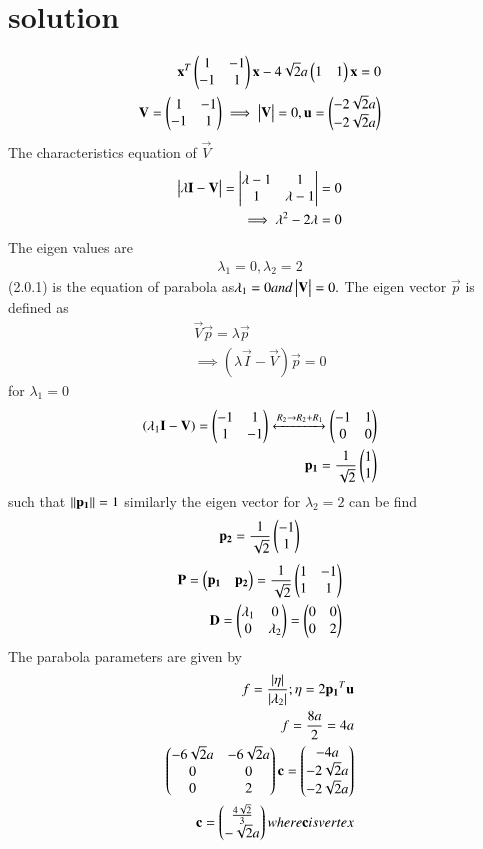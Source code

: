 \documentclass[journal,12pt,twocolumn]{IEEEtran}
\begin{document}
\section{solution}
\begin{align}
\mathbf{x}^T\begin{pmatrix}1&-1\\-1&1\end{pmatrix}\mathbf{x}-4\sqrt{2}a\begin{pmatrix}1&1\end{pmatrix}\mathbf{x}=0\\
\mathbf{V}=\begin{pmatrix}1&-1\\-1&1\end{pmatrix}\implies\begin{vmatrix}\mathbf{V}\end{vmatrix}=0,\mathbf{u}=\begin{pmatrix}-2\sqrt{2}a\\-2\sqrt{2}a\end{pmatrix}
\end{align}
The characteristics equation of $\vec{V}$
\begin{align}
\begin{vmatrix}\lambda\mathbf{I}-\mathbf{V}\end{vmatrix}=\begin{vmatrix}\lambda-1&1\\1&\lambda-1\end{vmatrix}=0\\
\implies\lambda^{2}-2\lambda=0
\end{align}
The eigen values are
\begin{align}
  \lambda{_1}=0,\lambda{_2} =2
\end{align}
(2.0.1) is the equation of parabola as$\lambda{_1}=0 and \begin{vmatrix}\mathbf{V}\end{vmatrix}=0.$ 
The eigen vector $\vec{p}$ is defined as
\begin{align}
    \vec{V}\vec{p}=\lambda{\vec{p}}\\
    \implies(\lambda{\vec{I}}-\vec{V})\vec{p}=0
\end{align}
for $\lambda{_1}=0$
\begin{align}
(\lambda{_1}\mathbf{I}-\mathbf{V})= \begin{pmatrix}-1&1\\1&-1\end{pmatrix}\xleftrightarrow[]{R_2\rightarrow{R_2+R_1}}\begin{pmatrix}-1&1\\0&0\end{pmatrix}\\\mathbf{p_1}=\frac{1}{\sqrt{2}}\begin{pmatrix}1\\1\end{pmatrix}
\end{align}
such that $\lVert\mathbf{p_1}\rVert=1$ similarly the eigen vector for $\lambda{_2}=2$ can be find
\begin{align}
    \mathbf{p_2}=\frac{1}{\sqrt{2}}\begin{pmatrix}-1\\1\end{pmatrix}
\end{align}
\begin{align}
\mathbf{P}=\begin{pmatrix}\mathbf{p_1}&\mathbf{p_2}\end{pmatrix}=\frac{1}{\sqrt{2}}\begin{pmatrix}1&-1\\1&1\end{pmatrix}\\
\mathbf{D}=\begin{pmatrix}\lambda_1&0\\0&\lambda_2\end{pmatrix}=\begin{pmatrix}0&0\\0&2\end{pmatrix}
\end{align}
The parabola parameters are given by
\begin{align}
    f=\frac{|\eta|}{|\lambda{_2}|} ; \eta=2\mathbf{p_1}^T\mathbf{u}\\
    f= \frac{8a}{2}=4a\\
    \begin{pmatrix}-6\sqrt{2}a &-6\sqrt{2}a \\ 0 & 0 \\ 0 & 2\end{pmatrix}\mathbf{c}=\begin{pmatrix}-4a\\-2\sqrt{2}a\\-2\sqrt{2}a\end{pmatrix}\\
    \mathbf{c}=\begin{pmatrix}\frac{4\sqrt{2}}{3}\\-\sqrt{2}a\end{pmatrix} where \mathbf{c} is vertex
\end{align}
\end{document}
